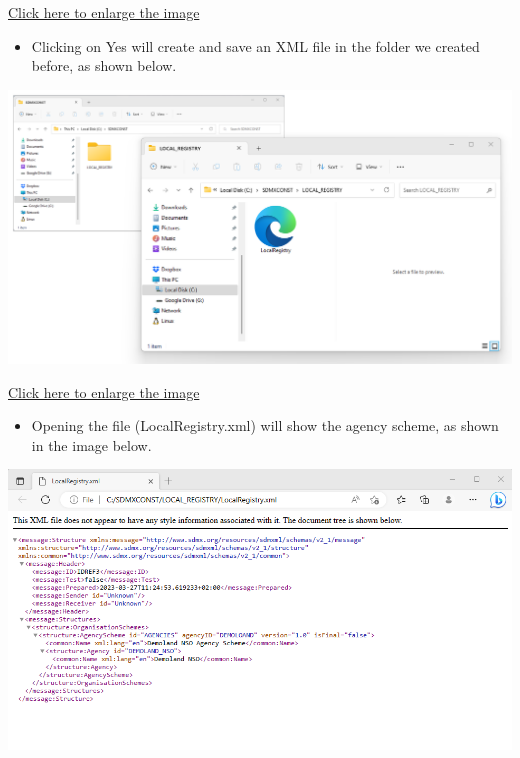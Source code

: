 \documentclass[
]{book}
\providecommand{\tightlist}{%
  \setlength{\itemsep}{0pt}\setlength{\parskip}{0pt}}
\begin{document}
\href{images/image076.png}{Click here to enlarge the image}

\begin{itemize}
\tightlist
\item
  Clicking on Yes will create and save an XML file in the folder we created before, as shown below.
\end{itemize}

\begin{center}\includegraphics[width=1\linewidth]{./images/image078} \end{center}

\href{images/image078.png}{Click here to enlarge the image}

\begin{itemize}
\tightlist
\item
  Opening the file (LocalRegistry.xml) will show the agency scheme, as shown in the image below.
\end{itemize}

\begin{center}\includegraphics[width=1\linewidth]{./images/image080} \end{center}
\end{document}
